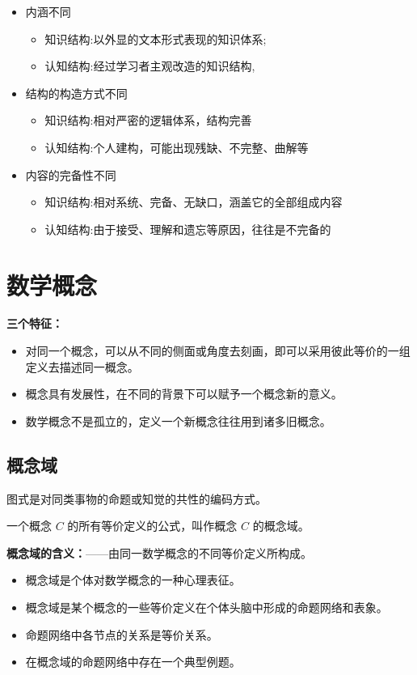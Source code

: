 \begin{itemize}
    \item 内涵不同
    \begin{itemize}
        \item 知识结构:以外显的文本形式表现的知识体系;
        \item 认知结构:经过学习者主观改造的知识结构,
    \end{itemize}
    \item 结构的构造方式不同
    \begin{itemize}
        \item 知识结构:相对严密的逻辑体系，结构完善
        \item 认知结构:个人建构，可能出现残缺、不完整、曲解等
    \end{itemize}
    \item 内容的完备性不同
    \begin{itemize}
        \item 知识结构:相对系统、完备、无缺口，涵盖它的全部组成内容 
        \item 认知结构:由于接受、理解和遗忘等原因，往往是不完备的
    \end{itemize}
\end{itemize}

\section{数学概念}

\textbf{三个特征：}

\begin{itemize}
    \item 对同一个概念，可以从不同的侧面或角度去刻画，即可以采用彼此等价的一组定义去描述同一概念。
    \item 概念具有发展性，在不同的背景下可以赋予一个概念新的意义。
    \item 数学概念不是孤立的，定义一个新概念往往用到诸多旧概念。
\end{itemize}

\subsection{概念域}

图式是对同类事物的命题或知觉的共性的编码方式。

一个概念 $C$ 的所有等价定义的公式，叫作概念 $C$ 的概念域。

\textbf{概念域的含义：}——由同一数学概念的不同等价定义所构成。

\begin{itemize}
    \item 概念域是个体对数学概念的一种心理表征。
    \item 概念域是某个概念的一些等价定义在个体头脑中形成的命题网络和表象。
    \item 命题网络中各节点的关系是等价关系。
    \item 在概念域的命题网络中存在一个典型例题。
\end{itemize}

